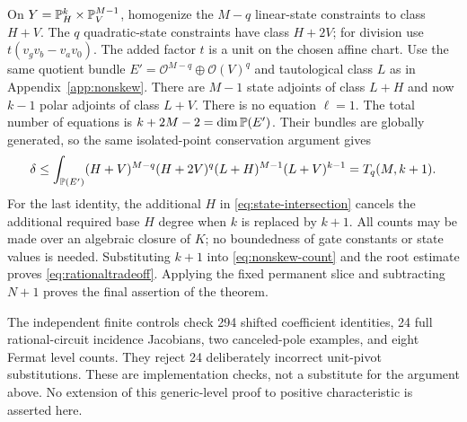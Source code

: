 On $Y=\mathbb P^k_H\times\mathbb P^{M-1}_V$, homogenize the $M-q$ linear-state
constraints to class $H+V$. The $q$ quadratic-state constraints have
class $H+2V$; for division use $t(v_gv_b-v_av_0)$. The added factor
$t$ is a unit on the chosen affine chart. Use the same quotient
bundle $E'=\mathcal O^{M-q}\oplus\mathcal O(V)^q$ and tautological
class $L$ as in Appendix~\ref{app:nonskew}. There are $M-1$ state
adjoints of class $L+H$ and now $k-1$ polar adjoints of class $L+V$.
There is no equation $\ell=1$. The total number of equations is
$k+2M-2=\dim\mathbb P(E')$. Their bundles are globally generated, so the
same isolated-point conservation argument gives
\[
 \delta\le\int_{\mathbb P(E')}
 (H+V)^{M-q}(H+2V)^q(L+H)^{M-1}(L+V)^{k-1}
 =T_q(M,k+1).
\]
For the last identity, the additional $H$ in
\eqref{eq:state-intersection} cancels the additional required base
$H$ degree when $k$ is replaced by $k+1$. All counts may be made
over an algebraic closure of $K$; no boundedness of gate constants
or state values is needed. Substituting $k+1$ into
\eqref{eq:nonskew-count} and the root estimate proves
\eqref{eq:rationaltradeoff}. Applying the fixed permanent slice and
subtracting $N+1$ proves the final assertion of the theorem.

The independent finite controls check 294 shifted coefficient
identities, 24 full rational-circuit incidence Jacobians, two
canceled-pole examples, and eight Fermat level counts. They reject
24 deliberately incorrect unit-pivot substitutions. These are
implementation checks, not a substitute for the argument above.
No extension of this generic-level proof to positive characteristic
is asserted here.
